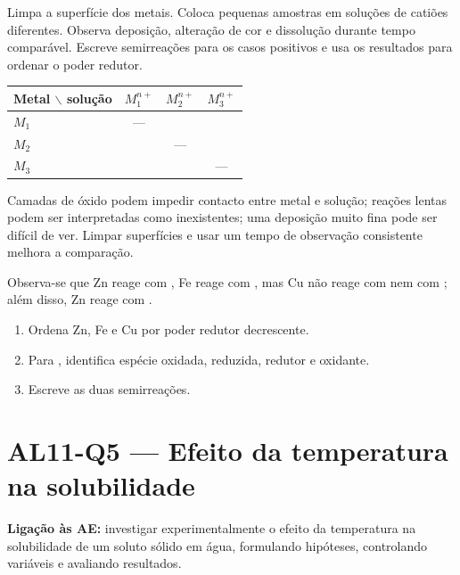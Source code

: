 \documentclass[11pt,a4paper,openany]{book}
\newcounter{exercicio}[chapter]
\renewcommand{\theexercicio}{\thechapter.\arabic{exercicio}}
\newenvironment{exercicio}[1][]%
{\refstepcounter{exercicio}%
\begin{tcolorbox}[breakable,colback=white,colframe=eublue!70,
 title={Exercício \theexercicio\if\relax\detokenize{#1}\relax\else\ --- #1\fi},fonttitle=\bfseries]}%
{\end{tcolorbox}}
\newcommand{\LigAE}[1]{\textbf{Ligação às AE:} #1}
\begin{document}
\begin{metodo}
Limpa a superfície dos metais. Coloca pequenas amostras em soluções de catiões diferentes. Observa deposição, alteração de cor e dissolução durante tempo comparável. Escreve semirreações para os casos positivos e usa os resultados para ordenar o poder redutor.
\end{metodo}

\begin{registo}
\begin{center}
\begin{tabular}{@{}lccc@{}}
\toprule
Metal $\backslash$ solução & $M_1^{n+}$ & $M_2^{n+}$ & $M_3^{n+}$\\
\midrule
$M_1$ & --- & &\\
$M_2$ & & --- &\\
$M_3$ & & & ---\\
\bottomrule
\end{tabular}
\end{center}
\end{registo}

\begin{erros}
Camadas de óxido podem impedir contacto entre metal e solução; reações lentas podem ser interpretadas como inexistentes; uma deposição muito fina pode ser difícil de ver. Limpar superfícies e usar um tempo de observação consistente melhora a comparação.
\end{erros}

\begin{exercicio}[Redox e ordenação]
Observa-se que Zn reage com , Fe reage com , mas Cu não reage com  nem com ; além disso, Zn reage com .
\begin{enumerate}[label=\alph*)]
\item Ordena Zn, Fe e Cu por poder redutor decrescente.
\item Para , identifica espécie oxidada, reduzida, redutor e oxidante.
\item Escreve as duas semirreações.
\end{enumerate}
\end{exercicio}

\section{AL11-Q5 — Efeito da temperatura na solubilidade}
\LigAE{investigar experimentalmente o efeito da temperatura na solubilidade de um soluto sólido em água, formulando hipóteses, controlando variáveis e avaliando resultados.}
\end{document}
